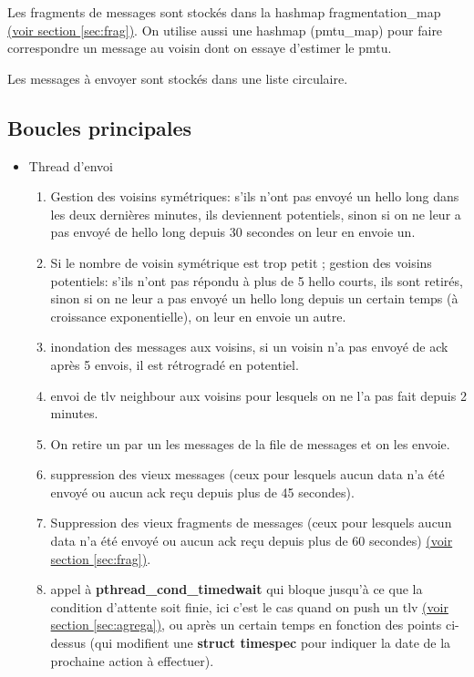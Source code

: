\documentclass[a4paper,10pt]{article} %
\begin{document}
Les fragments de messages sont stockés dans la hashmap \textrm{fragmentation\_map} \hyperref[sec:frag]{(voir section \ref{sec:frag})}. On utilise aussi une hashmap (\textrm{pmtu\_map}) pour faire correspondre un message au voisin dont on essaye d'estimer le pmtu.

Les messages à envoyer sont stockés dans une liste circulaire.

\subsection{Boucles principales}
\begin{itemize}
    \item Thread d'envoi
\begin{enumerate}
\item Gestion des voisins symétriques: s'ils n'ont pas envoyé un hello long dans les deux dernières minutes, ils deviennent potentiels, sinon si on ne leur a pas envoyé de hello long depuis 30 secondes on leur en envoie un.
\item Si le nombre de voisin symétrique est trop petit ; gestion des voisins potentiels: s'ils n'ont pas répondu à plus de 5 hello courts, ils sont retirés, sinon si on ne leur a pas envoyé un hello long depuis un certain temps (à croissance exponentielle), on leur en envoie un autre.
\item inondation des messages aux voisins, si un voisin n'a pas envoyé de ack après 5 envois, il est rétrogradé en potentiel.
\item envoi de tlv neighbour aux voisins pour lesquels on ne l'a pas fait depuis 2 minutes.
\item On retire un par un les messages de la file de messages et on les envoie.
\item suppression des vieux messages (ceux pour lesquels aucun data n'a été envoyé ou aucun ack reçu depuis plus de 45 secondes).
\item Suppression des vieux fragments de messages (ceux pour lesquels aucun data n'a été envoyé ou aucun ack reçu depuis plus de 60 secondes) \hyperref[sec:frag]{(voir section \ref{sec:frag})}.
\item appel à \textbf{pthread\_cond\_timedwait} qui bloque jusqu'à ce que la condition d'attente soit finie, ici c'est le cas quand on push un tlv \hyperref[sec:frag]{(voir section \ref{sec:agrega})}, ou après un certain temps en fonction des points ci-dessus (qui modifient une \textbf{struct timespec} pour indiquer la date de la prochaine action à effectuer).


\end{enumerate}
\end{itemize}
\end{document}
